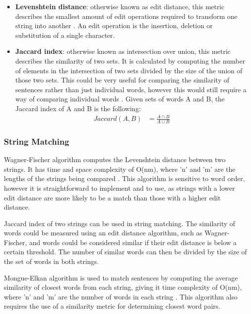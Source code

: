 \documentclass{article}
\begin{document}
\begin{itemize}
    \item \textbf{Levenshtein distance}: otherwise known as edit distance, this metric describes the smallest amount of edit operations required to transform one string into another \cite{levenshtein_distance}. An edit operation is the insertion, deletion or substitution of a single character. 
    \item \textbf{Jaccard index}: otherwise known as intersection over union, this metric describes the similarity of two sets. It is calculated by computing the number of elements in the intersection of two sets divided by the size of the union of those two sets. This could be very useful for comparing the similarity of sentences rather than just individual words, however this would still require a way of comparing individual words \cite{jaccard} \cite{string_similarity_ontology}. Given sets of words A and B, the Jaccard index of A and B is the following: 
    \begin{align*}
        Jaccard(A,B) &= \frac{A \cap B}{A \cup B}
    \end{align*}
\end{itemize}

\subsubsection{String Matching}
Wagner-Fischer algorithm computes the Levenshtein distance between two strings. It has time and space complexity of O(nm), where 'n' and 'm' are the lengths of the strings being compared \cite{wagner_fischer}. This algorithm is sensitive to word order, however it is straightforward to implement and to use, as strings with a lower edit distance are more likely to be a match than those with a higher edit distance. 

\bigskip
\noindent Jaccard index of two strings can be used in string matching. The similarity of words could be measured using an edit distance algorithm, such as Wagner-Fischer, and words could be considered similar if their edit distance is below a certain threshold. The number of similar words can then be divided by the size of the set of words in both strings.

\bigskip
\noindent Mongue-Elkan algorithm is used to match sentences by computing the average similarity of closest words from each string, giving it time complexity of O(nm), where 'n' and 'm' are the number of words in each string \cite{mongue_elkan}. This algorithm also requires the use of a similarity metric for determining closest word pairs. 
\end{document}
